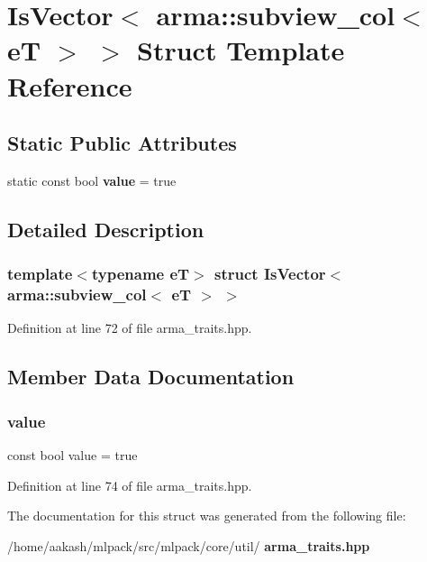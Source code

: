 \section{Is\+Vector$<$ arma\+:\+:subview\+\_\+col$<$ eT $>$ $>$ Struct Template Reference}
\label{structIsVector_3_01arma_1_1subview__col_3_01eT_01_4_01_4}
\subsection*{Static Public Attributes}
\begin{DoxyCompactItemize}
\item 
static const bool \textbf{ value} = true
\end{DoxyCompactItemize}


\subsection{Detailed Description}
\subsubsection*{template$<$typename eT$>$\newline
struct Is\+Vector$<$ arma\+::subview\+\_\+col$<$ e\+T $>$ $>$}



Definition at line 72 of file arma\+\_\+traits.\+hpp.



\subsection{Member Data Documentation}
\mbox{\label{structIsVector_3_01arma_1_1subview__col_3_01eT_01_4_01_4_a11ddd051208250c32dc4985abcafa86d}} 
\subsubsection{value}
{\footnotesize\ttfamily const bool value = true\hspace{0.3cm}{\ttfamily [static]}}



Definition at line 74 of file arma\+\_\+traits.\+hpp.



The documentation for this struct was generated from the following file\+:\begin{DoxyCompactItemize}
\item 
/home/aakash/mlpack/src/mlpack/core/util/\textbf{ arma\+\_\+traits.\+hpp}\end{DoxyCompactItemize}
